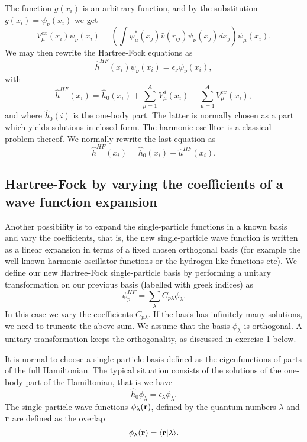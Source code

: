 \documentclass[%
oneside,                 %
final,                   %
10pt]{article}
\begin{document}
The function $g(x_i)$ is an arbitrary function,
and by the substitution $g(x_i) = \psi_{\nu}(x_i)$
we get
\begin{equation*}
  V_{\mu}^{ex}(x_i) \psi_{\nu}(x_i) 
  = \left(\int \psi_{\mu}^*(x_j) 
 \hat{v}(r_{ij})\psi_{\nu}(x_j)
  dx_j\right)\psi_{\mu}(x_i).
\end{equation*}
We may then rewrite the Hartree-Fock equations as
\[
  \hat{h}^{HF}(x_i) \psi_{\nu}(x_i) = \epsilon_{\nu}\psi_{\nu}(x_i),
\]
with
\[
  \hat{h}^{HF}(x_i)= \hat{h}_0(x_i) + \sum_{\mu=1}^AV_{\mu}^{d}(x_i) -
  \sum_{\mu=1}^AV_{\mu}^{ex}(x_i),
\]
and where $\hat{h}_0(i)$ is the one-body part. The latter is normally chosen as a part which yields solutions in closed form. The harmonic oscilltor is a classical problem thereof.
We normally rewrite the last equation as
\[
  \hat{h}^{HF}(x_i)= \hat{h}_0(x_i) + \hat{u}^{HF}(x_i). 
\]




\subsection{Hartree-Fock by varying the coefficients of a wave function expansion}

Another possibility is to expand the single-particle functions in a known basis  and vary the coefficients, 
that is, the new single-particle wave function is written as a linear expansion
in terms of a fixed chosen orthogonal basis (for example the well-known harmonic oscillator functions or the hydrogen-like functions etc).
We define our new Hartree-Fock single-particle basis by performing a unitary transformation 
on our previous basis (labelled with greek indices) as
\begin{equation}
\psi_p^{HF}  = \sum_{\lambda} C_{p\lambda}\phi_{\lambda}. \label{eq:newbasis}
\end{equation}
In this case we vary the coefficients $C_{p\lambda}$. If the basis has infinitely many solutions, we need
to truncate the above sum.  We assume that the basis $\phi_{\lambda}$ is orthogonal. A unitary transformation keeps the orthogonality, as discussed in exercise 1 below.  




It is normal to choose a single-particle basis defined as the eigenfunctions
of parts of the full Hamiltonian. The typical situation consists of the solutions of the one-body part of the Hamiltonian, that is we have
\[
\hat{h}_0\phi_{\lambda}=\epsilon_{\lambda}\phi_{\lambda}.
\]
The single-particle wave functions $\phi_{\lambda}({\bf r})$, defined by the quantum numbers $\lambda$ and ${\bf r}$
are defined as the overlap 
\[
   \phi_{\lambda}({\bf r})  = \langle {\bf r} | \lambda \rangle .
\]
\end{document}
